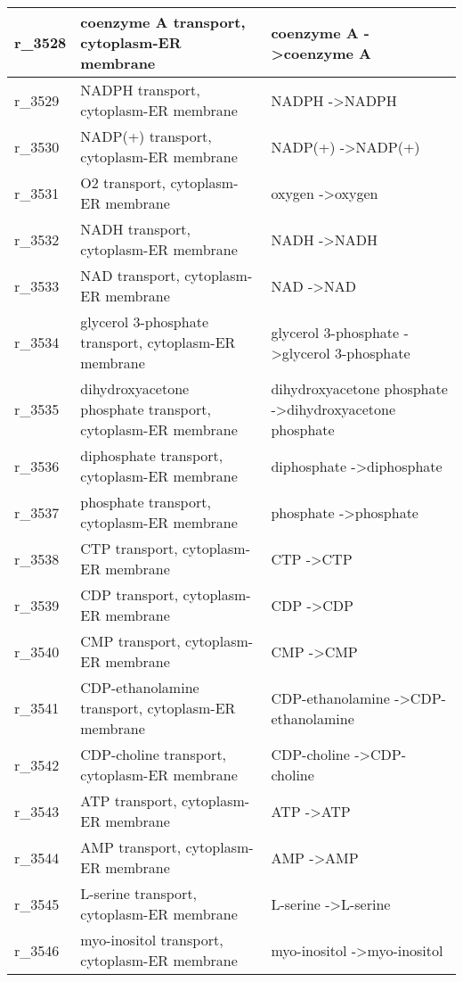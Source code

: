 \begin{landscape}
{\begin{longtable}{|l|p{7cm}|p{15cm}|}
r\_3528 & coenzyme A transport, cytoplasm-ER membrane & coenzyme A  -\textgreater coenzyme A \\ \hline
r\_3529 & NADPH transport, cytoplasm-ER membrane & NADPH  -\textgreater NADPH \\ \hline
r\_3530 & NADP(+) transport, cytoplasm-ER membrane & NADP(+)  -\textgreater NADP(+) \\ \hline
r\_3531 & O2 transport, cytoplasm-ER membrane & oxygen  -\textgreater oxygen \\ \hline
r\_3532 & NADH transport, cytoplasm-ER membrane & NADH  -\textgreater NADH \\ \hline
r\_3533 & NAD transport, cytoplasm-ER membrane & NAD  -\textgreater NAD \\ \hline
r\_3534 & glycerol 3-phosphate transport, cytoplasm-ER membrane & glycerol 3-phosphate  -\textgreater glycerol 3-phosphate \\ \hline
r\_3535 & dihydroxyacetone phosphate transport, cytoplasm-ER membrane & dihydroxyacetone phosphate  -\textgreater dihydroxyacetone phosphate \\ \hline
r\_3536 & diphosphate transport, cytoplasm-ER membrane & diphosphate  -\textgreater diphosphate \\ \hline
r\_3537 & phosphate transport, cytoplasm-ER membrane & phosphate  -\textgreater phosphate \\ \hline
r\_3538 & CTP transport, cytoplasm-ER membrane & CTP  -\textgreater CTP \\ \hline
r\_3539 & CDP transport, cytoplasm-ER membrane & CDP  -\textgreater CDP \\ \hline
r\_3540 & CMP transport, cytoplasm-ER membrane & CMP  -\textgreater CMP \\ \hline
r\_3541 & CDP-ethanolamine transport, cytoplasm-ER membrane & CDP-ethanolamine  -\textgreater CDP-ethanolamine \\ \hline
r\_3542 & CDP-choline transport, cytoplasm-ER membrane & CDP-choline  -\textgreater CDP-choline \\ \hline
r\_3543 & ATP transport, cytoplasm-ER membrane & ATP  -\textgreater ATP \\ \hline
r\_3544 & AMP transport, cytoplasm-ER membrane & AMP  -\textgreater AMP \\ \hline
r\_3545 & L-serine transport, cytoplasm-ER membrane & L-serine  -\textgreater L-serine \\ \hline
r\_3546 & myo-inositol transport, cytoplasm-ER membrane & myo-inositol  -\textgreater myo-inositol \\ \hline

\end{longtable}}
\end{landscape}
